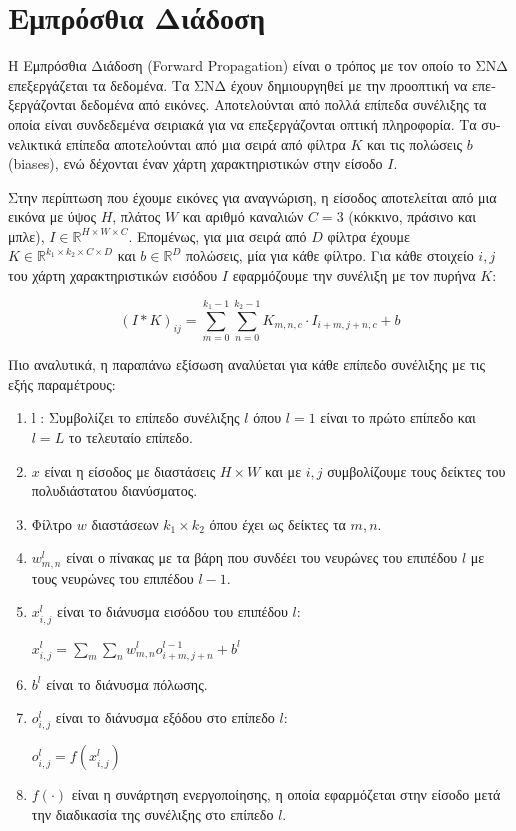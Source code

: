 \section{\textgreek{Εμπρόσθια Διάδοση}}
\textgreek{Η Εμπρόσθια Διάδοση }(Forward Propagation) \textgreek{είναι ο τρόπος με τον οποίο το ΣΝΔ επεξεργάζεται τα δεδομένα. Τα ΣΝΔ έχουν δημιουργηθεί με την προοπτική να επεξεργάζονται δεδομένα από εικόνες. Αποτελούνται από πολλά επίπεδα συνέλιξης τα οποία είναι συνδεδεμένα σειριακά για να επεξεργάζονται οπτική πληροφορία. Τα συνελικτικά επίπεδα αποτελούνται από μια σειρά από φίλτρα $\mathbf{\mathit{K}}$ και τις πολώσεις $\mathbf{\mathit{b}}$} (biases), \textgreek{ ενώ δέχονται έναν χάρτη χαρακτηριστικών στην είσοδο $\mathbf{\mathit{I}}$.}
\par
\textgreek{Στην περίπτωση που έχουμε εικόνες για αναγνώριση, η είσοδος αποτελείται από μια εικόνα με ύψος $\mathbf{\mathit{H}}$, πλάτος $\mathbf{\mathit{W}}$  και αριθμό καναλιών $\mathbf{\mathit{C =3 }}$ (κόκκινο, πράσινο και μπλε), $\mathbf{\mathit{I \in \mathbb{R}^{H\times W\times C}}}$. Επομένως, για μια σειρά από $D$ φίλτρα έχουμε $K \in \mathbb{R}^{k_1\times k_2\times C\times D}$ και $b \in \mathbb{R}^{D}$ πολώσεις, μία για κάθε φίλτρο. Για κάθε στοιχείο $i,j$ του χάρτη χαρακτηριστικών εισόδου $I$ εφαρμόζουμε την συνέλιξη με τον πυρήνα $K$:}

\begin{equation}
(I \ast K)_{ij} = \sum_{m=0}^{k_1-1} \sum_{n=0}^{k_2-1} \mathit{K_{m,n,c}} \cdot \mathit{I_{i+m,j+n,c}} + \mathit{b}
\end{equation}

\textgreek{Πιο αναλυτικά, η παραπάνω εξίσωση αναλύεται για κάθε επίπεδο συνέλιξης με τις εξής παραμέτρους:}

\begin{enumerate}
 \item l : \textgreek{Συμβολίζει το επίπεδο συνέλιξης $l$ όπου $l = 1$ είναι το πρώτο επίπεδο και $l = L$ το τελευταίο επίπεδο.}
\item \textgreek{$x$ είναι η είσοδος με διαστάσεις $H\times W$ και με $i,j$ συμβολίζουμε τους δείκτες του πολυδιάστατου διανύσματος.}
\item \textgreek{Φίλτρο $w$ διαστάσεων $k_1\times k_2$ όπου έχει ως δείκτες τα $m,n$.}
\item \textgreek{$w_{m,n}^{l}$ είναι ο πίνακας με τα βάρη που συνδέει του νευρώνες του επιπέδου $l$ με τους νευρώνες του επιπέδου $l-1$.}
\item \textgreek{$x_{i,j}^{l}$ είναι το διάνυσμα εισόδου του επιπέδου $l$}:\\[1em]
\centerline{ $x_{i,j}^{l} = \sum_{m} \sum_{n} w_{m,n}^{l} o_{i+m,j+n}^{l-1} + b^{l}$}

\item \textgreek{$b^{l}$ είναι το διάνυσμα πόλωσης.}
\item \textgreek{$o_{i,j}^{l}$ είναι το διάνυσμα εξόδου στο επίπεδο $l$}:\\[1em]
\centerline{$ o_{i,j}^{l} = f(x_{i,j}^{l})$}
\item \textgreek{ $f(\cdot)$ είναι η συνάρτηση ενεργοποίησης, η οποία εφαρμόζεται στην είσοδο μετά την διαδικασία της συνέλιξης στο επίπεδο $l$.}
\end{enumerate}

